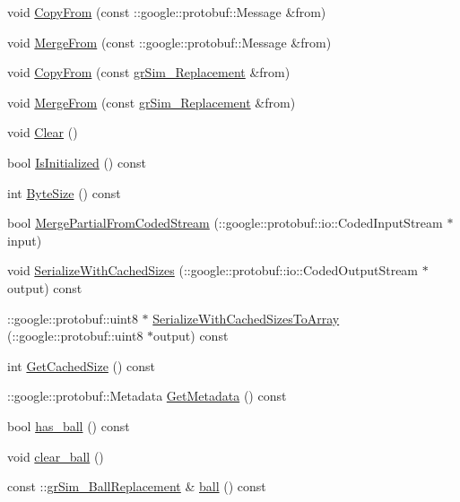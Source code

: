 \begin{DoxyCompactItemize}
void \hyperlink{classgr_sim___replacement_ab6a6d9518db9d617eb15de2c5eb64927}{Copy\-From} (const \-::google\-::protobuf\-::\-Message \&from)
\item 
void \hyperlink{classgr_sim___replacement_a8fd73a13baef42826839fa004a2a89f0}{Merge\-From} (const \-::google\-::protobuf\-::\-Message \&from)
\item 
void \hyperlink{classgr_sim___replacement_ac37a75f7bf7aabf012cbf3c8f7935751}{Copy\-From} (const \hyperlink{classgr_sim___replacement}{gr\-Sim\-\_\-\-Replacement} \&from)
\item 
void \hyperlink{classgr_sim___replacement_a495ad1f87a6da0f7c6c1710ae72fd281}{Merge\-From} (const \hyperlink{classgr_sim___replacement}{gr\-Sim\-\_\-\-Replacement} \&from)
\item 
void \hyperlink{classgr_sim___replacement_aaceb1c92ff4b80654fee9f2020e5313a}{Clear} ()
\item 
bool \hyperlink{classgr_sim___replacement_a3e3ebfc1cd23823987e583ed422891d5}{Is\-Initialized} () const 
\item 
int \hyperlink{classgr_sim___replacement_a5fd0feaf2efd2caed77fbe8f1a6564f6}{Byte\-Size} () const 
\item 
bool \hyperlink{classgr_sim___replacement_aae0b0ec3f2eea09fd415494c0d8d1ef1}{Merge\-Partial\-From\-Coded\-Stream} (\-::google\-::protobuf\-::io\-::\-Coded\-Input\-Stream $\ast$input)
\item 
void \hyperlink{classgr_sim___replacement_a19f4ae778547ce4f6b66967c93db58f4}{Serialize\-With\-Cached\-Sizes} (\-::google\-::protobuf\-::io\-::\-Coded\-Output\-Stream $\ast$output) const 
\item 
\-::google\-::protobuf\-::uint8 $\ast$ \hyperlink{classgr_sim___replacement_a1207e8eb298d2f4c16aa3725da874d2e}{Serialize\-With\-Cached\-Sizes\-To\-Array} (\-::google\-::protobuf\-::uint8 $\ast$output) const 
\item 
int \hyperlink{classgr_sim___replacement_a94707610276449086ee92528ca8b9e6f}{Get\-Cached\-Size} () const 
\item 
\-::google\-::protobuf\-::\-Metadata \hyperlink{classgr_sim___replacement_a71f3cef4dd2dd67bd45f5cbda90949e7}{Get\-Metadata} () const 
\item 
bool \hyperlink{classgr_sim___replacement_a6dafa8b517fa5cff32442de48a178c17}{has\-\_\-ball} () const 
\item 
void \hyperlink{classgr_sim___replacement_a11b0206234bf17048979306e43243ba4}{clear\-\_\-ball} ()
\item 
const \-::\hyperlink{classgr_sim___ball_replacement}{gr\-Sim\-\_\-\-Ball\-Replacement} \& \hyperlink{classgr_sim___replacement_ab890efa0f7a5a7fd347489265ba561fa}{ball} () const 

\end{DoxyCompactItemize}
